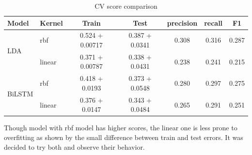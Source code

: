 \documentclass[11pt]{article}
\begin{document}
\begin{table}[htb]
\begin{center}
\begin{tabular}{ |p{1.5cm}|p{1cm}|c|c|c|c|c| }
\hline
Model 	& Kernel 	& Train & Test & precision & recall & F1 \\ \hline
\multirow{2}{*}{LDA} &	rbf		& 0.524 + 0.00717 & 0.387 + 0.0341 & 0.308 & 0.316 & 0.287 \\ 
& linear	& 0.371 + 0.00787 & 0.338 + 0.0431 & 0.238 & 0.241 & 0.215 \\ \hline
\multirow{2}{*}{BiLSTM}&	rbf		& 0.418 + 0.0193 & 0.373 + 0.0548 & 0.280 & 0.297 & 0.275 \\ 
& linear	& 0.376 + 0.0147 & 0.343 + 0.0484 & 0.265 & 0.291 & 0.251 \\ \hline
\end{tabular}
\caption{CV score comparison}
\end{center}
\end{table}
\FloatBarrier

Though model with rbf model has higher scores, the linear one is less prone to overfitting as shown by the small difference between train and test errors. It was decided to try both and observe their behavior.
\end{document}
